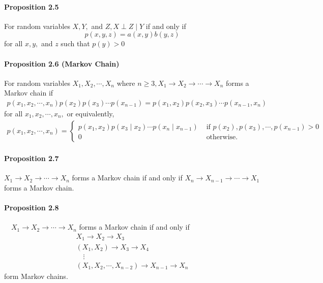 \documentclass[8pt]{article}
\begin{document}
\paragraph{Proposition 2.5} For random variables $X, Y,$ and $Z, X \perp Z \mid Y$ if and only if
$$
p(x, y, z)=a(x, y) b(y, z)
$$
for all $x, y,$ and $z$ such that $p(y)>0$

\paragraph{Proposition 2.6 (Markov Chain)} For random variables $X_{1}, X_{2}, \cdots, X_{n}$ where $n \geq 3, X_{1} \rightarrow X_{2} \rightarrow \cdots \rightarrow X_{n}$ forms a Markov chain if
$$
\begin{array}{l}
p\left(x_{1}, x_{2}, \cdots, x_{n}\right) p\left(x_{2}\right) p\left(x_{3}\right) \cdots p\left(x_{n-1}\right) =p\left(x_{1}, x_{2}\right) p\left(x_{2}, x_{3}\right) \cdots p\left(x_{n-1}, x_{n}\right)
\end{array}
$$
for all $x_{1}, x_{2}, \cdots, x_{n},$ or equivalently,
$$
\begin{array}{l}
p\left(x_{1}, x_{2}, \cdots, x_{n}\right)=
 \left\{\begin{array}{ll}
p\left(x_{1}, x_{2}\right) p\left(x_{3} \mid x_{2}\right) \cdots p\left(x_{n} \mid x_{n-1}\right) & \text { if } p\left(x_{2}\right), p\left(x_{3}\right), \cdots, p\left(x_{n-1}\right)>0 \\
0 & \text { otherwise. }
\end{array}\right.
\end{array}
$$

\paragraph{Proposition 2.7} $X_{1} \rightarrow X_{2} \rightarrow \cdots \rightarrow X_{n}$ forms a Markov chain if and only if $X_{n} \rightarrow X_{n-1} \rightarrow \cdots \rightarrow X_{1}$ forms a Markov chain.

\paragraph{Proposition 2.8} $\quad X_{1} \rightarrow X_{2} \rightarrow \cdots \rightarrow X_{n}$ forms a Markov chain if and only if
$$
\begin{array}{l}
X_{1} \rightarrow X_{2} \rightarrow X_{3} \\
\left(X_{1}, X_{2}\right) \rightarrow X_{3} \rightarrow X_{4} \\
\quad \vdots \\
\left(X_{1}, X_{2}, \cdots, X_{n-2}\right) \rightarrow X_{n-1} \rightarrow X_{n}
\end{array}
$$
form Markov chains.
\end{document}

